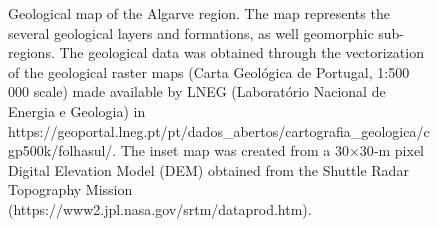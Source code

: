 \documentclass[
  a4paper,
  DIV=11,
  numbers=noendperiod]{scrreprt}
\begin{document}
\begin{figure}


\caption{\label{fig-frames-geomap}Geological map of the Algarve region.
The map represents the several geological layers and formations, as well
geomorphic sub-regions. The geological data was obtained through the
vectorization of the geological raster maps (Carta Geológica de
Portugal, 1:500 000 scale) made available by LNEG (Laboratório Nacional
de Energia e Geologia) in
https://geoportal.lneg.pt/pt/dados\_abertos/cartografia\_geologica/cgp500k/folhasul/.
The inset map was created from a 30×30‐m pixel Digital Elevation Model
(DEM) obtained from the Shuttle Radar Topography Mission
(https://www2.jpl.nasa.gov/srtm/dataprod.htm).}

\end{figure}%
\end{document}
